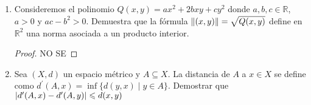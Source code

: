 \documentclass[12pt]{article}
\newcommand\R{\ensuremath{\mathbb{R}}}
\begin{document}
\begin{enumerate}[label=\textbf{\arabic*}.]
\begin{proof}
    \begin{enumerate}
        \item Notemos que la norma infinito no satisface la identidad del paralelogramo. Sea $x = (1,0,...,0) , y = (0,-1,0,...,0) \in \R^n$

        \begin{equation*}
            {\norm{x+y}}^{2} + {\norm{x-y}}^{2} = 2 {\norm{x}}^{2} + 2 {\norm{y}}^{2}
        \end{equation*}
        \begin{equation*}
            {\max \{ \abs{{x}_{i}+{y}_{i}} \mid i = 1,...,n\}}^{2} + {\max \{ \abs{{x}_{i}-{y}_{i}}\}}^{2} = 2 \cdot {\max \{ \abs{{x}_{i}}\}}^{2} +  2 \cdot {\max \{ \abs{{y}_{i}} \}}^{2}
        \end{equation*}
        \begin{equation*}
            1^2 + 1^2 = 2 \neq 2 \cdot 1^2 + 2 \cdot 1^2 = 4
        \end{equation*}
        \item Notemos que la norma uno no satisface la identidad del paralelogramo. Sea $x = (1,0,...,0)$,  $y = (0,1,0,...,0) \in \R^n$

        \begin{equation*}
        \sum_{i=1}^{n} \abs{x_i + y_i}^2 + \sum_{i=1}^{n} \abs{x_i - y_i}^2 = 2 \sum_{i=1}^{n} \abs{x_i}^2 + 2 \sum_{i=1}^{n} \abs{y_i}^2
    \end{equation*}
    \begin{equation*}
        2^2 + 2^2 = 8 \neq 2 \cdot 1^2 + 2 \cdot 1^2 = 4
    \end{equation*}
    \end{enumerate}
\end{proof}

\item Consideremos el polinomio $Q(x, y) = ax^2 + 2bxy + cy^2$ donde $a, b, c \in \R$, $a > 0$ y $ac - b^2 > 0$. Demuestra que la fórmula $\norm{(x, y)} = \sqrt{Q(x, y)} $ define en $\R^2$ una norma asociada a un producto interior.

\begin{proof}
    NO SE
\end{proof}

\item Sea $(X, d)$ un espacio métrico y $A \subseteq X$. La distancia de $A$ a $x \in X $ se define como ${d}^{\prime}(A,x) = \inf \{ d(y,x) \mid y \in A \}$. Demostrar que $\abs{{d}^{\prime}(A,x)-{d}^{\prime}(A,y)} \leqslant d(x,y)$


\end{enumerate}
\end{document}
